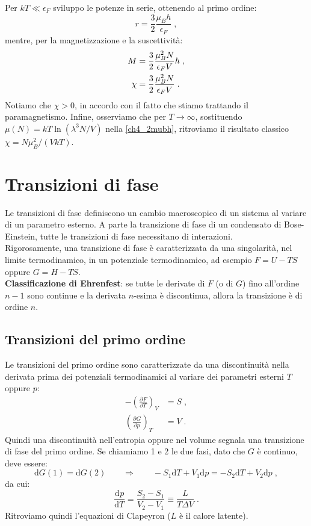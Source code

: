\documentclass[10pt,a4paper]{report}
\theoremstyle{definition}
\newcommand{\pdev}[3][]{\frac{\partial^{#1} #2}{\partial #3^{#1}}}
\newcommand{\dev}[3][]{\frac{\mathrm{d}^{#1} #2}{\mathrm{d} #3^{#1}}}
\numberwithin{equation}{section}
\newcommand{\diff}[1][]{\mathrm{d}#1}
\begin{document}
Per $kT\ll \epsilon_F$ sviluppo le potenze in serie, ottenendo al primo ordine:
\begin{equation}
r=\frac{3}{2}\frac{\mu_Bh}{\epsilon_F}\;,
\end{equation}
mentre, per la magnetizzazione e la suscettività:
\begin{align}
M&=\frac{3}{2}\frac{\mu_B^2N}{\epsilon_FV}h\;, \notag \\
\chi &= \frac{3}{2}\frac{\mu_B^2N}{\epsilon_FV}\;.
\end{align}
Notiamo che $\chi>0$, in accordo con il fatto che stiamo trattando il paramagnetismo. Infine, osserviamo che per $T\to\infty$, sostituendo $\mu(N)=kT\ln(\lambda^3N/V)$ nella \eqref{ch4_2mubh}, ritroviamo il risultato classico  $\chi=N\mu_B^2/(VkT)$.
\chapter{Transizioni di fase}
Le transizioni di fase definiscono un cambio macroscopico di un sistema al variare di un parametro esterno. A parte la transizione di fase di un condensato di Bose-Einstein, tutte le transizioni di fase necessitano di interazioni. \\
Rigorosamente, una transizione di fase è caratterizzata da una singolarità, nel limite termodinamico, in un potenziale termodinamico, ad esempio $F=U-TS$ oppure $G=H-TS$. \\

\textbf{Classificazione di Ehrenfest}: se tutte le derivate di $F$ (o di $G$) fino all'ordine $n-1$ sono continue e la derivata $n$-esima è discontinua, allora la transizione è di ordine $n$.
\section{Transizioni del primo ordine}
Le transizioni del primo ordine sono caratterizzate da una discontinuità nella derivata prima dei potenziali termodinamici al variare dei parametri esterni $T$ oppure $p$:
\begin{align*}
-\left(\pdev{F}{T}\right)_V &=S\;, \\
\left(\pdev{G}{p}\right)_T &=V\;.
\end{align*}
Quindi una discontinuità nell'entropia oppure nel volume segnala una transizione di fase del primo ordine. Se chiamiamo 1 e 2 le due fasi, dato che $G$ è continuo, deve essere:
$$
\diff{G}(1)=\diff{G}(2)\qquad \Longrightarrow\qquad -S_1\diff{T}+V_1\diff{p}=-S_2\diff{T}+V_2\diff{p}\;,
$$
da cui:
\begin{equation}
\dev{p}{T}=\frac{S_2-S_1}{V_2-V_1}\equiv \frac{L}{T\Delta V}\;.
\end{equation}
Ritroviamo quindi l'equazioni di Clapeyron ($L$ è il calore latente).
\end{document}
